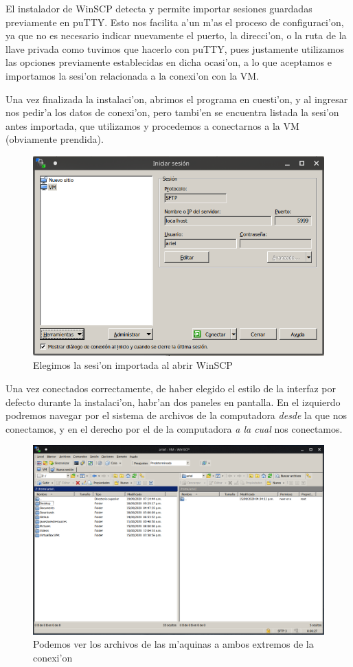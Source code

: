 \documentclass[11pt]{article}
\begin{document}
	El instalador de WinSCP detecta y permite importar sesiones guardadas previamente en puTTY. Esto nos facilita a'un m'as el proceso de configuraci'on, ya que no es necesario indicar nuevamente el puerto, la direcci'on, o la ruta de la llave privada como tuvimos que hacerlo con puTTY, pues justamente utilizamos las opciones previamente establecidas en dicha ocasi'on, a lo que aceptamos e importamos la sesi'on relacionada a la conexi'on con la VM.
	
	Una vez finalizada la instalaci'on, abrimos el programa en cuesti'on, y al ingresar nos pedir'a los datos de conexi'on, pero tambi'en se encuentra listada la sesi'on antes importada, que utilizamos y procedemos a conectarnos a la VM (obviamente prendida).
	
	\begin{figure}[H]
		\centering \captionsetup{justification=centering}
		\includegraphics[width=.8\linewidth]{Images/WinSCP/fig2}
		\caption{Elegimos la sesi'on importada al abrir WinSCP}
	\end{figure}

	Una vez conectados correctamente, de haber elegido el estilo de la interfaz por defecto durante la instalaci'on, habr'an dos paneles en pantalla. En el izquierdo podremos navegar por el sistema de archivos de la computadora \emph{desde} la que nos conectamos, y en el derecho por el de la computadora \emph{a la cual} nos conectamos.
	
	\begin{figure}[H]
		\centering \captionsetup{justification=centering}
		\includegraphics[width=.8\linewidth]{Images/WinSCP/fig3}
		\caption{Podemos ver los archivos de las m'aquinas a ambos extremos de la conexi'on}
	\end{figure}
\end{document}
